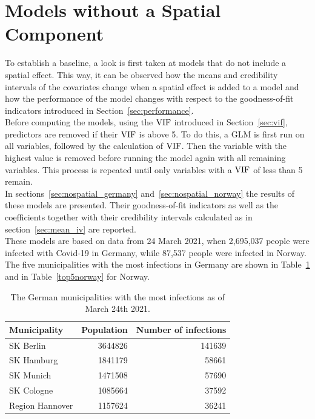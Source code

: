 \section{Models without a Spatial Component}\label{sec:nospatial}
To establish a baseline, a look is first taken at models that do not include a spatial effect. This way, it can be observed how the means and credibility intervals of the covariates change when a spatial effect is added to a model and how the performance of the model changes with respect to the goodness-of-fit indicators introduced in Section~\ref{sec:performance}. \\
Before computing the models, using the $\hbox{VIF}$ introduced in Section~\ref{sec:vif}, predictors are removed if their $\hbox{VIF}$ is above 5. To do this, a GLM is first run on all variables, followed by the calculation of $\hbox{VIF}$. Then the variable with the highest value is removed before running the model again with all remaining variables. This process is repeated until only variables with a $\hbox{VIF}$ of less than 5 remain. \\
In sections~\ref{sec:nospatial_germany} and~\ref{sec:nospatial_norway} the results of these models are presented. Their goodness-of-fit indicators as well as the coefficients together with their credibility intervals calculated as in section~\ref{sec:mean_iv} are reported. \\
These models are based on data from 24 March 2021, when 2,695,037 people were infected with Covid-19 in Germany, while 87,537 people were infected in Norway. The five municipalities with the most infections in Germany are shown in Table~\ref{top5germany} and in Table~\ref{top5norway} for Norway.
\begin{table}[H] 
\caption{The German municipalities with the most infections as of March 24th 2021. \label{top5germany}}
\begin{tabular}{l r r}
\toprule
\textbf{Municipality}	& \textbf{Population}	& \textbf{Number of infections} \\
\midrule
SK Berlin & 3644826 & 141639  \\   
SK Hamburg & 1841179 & 58661  \\
SK Munich & 1471508 & 57690  \\
SK Cologne & 1085664 & 37592  \\
Region Hannover & 1157624 & 36241  \\
\bottomrule
\end{tabular}
\end{table}
